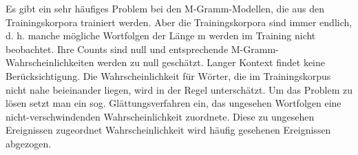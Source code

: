 Es gibt ein sehr h\"aufiges Problem bei den M-Gramm-Modellen, die aus den Trainingskorpora trainiert werden. Aber die Trainingskorpora sind immer endlich, d. h.  manche m\"ogliche Wortfolgen der L\"ange m werden im Training nicht beobachtet. Ihre Counts sind null und entsprechende M-Gramm-Wahrscheinlichkeiten werden zu null gesch\"atzt. Langer Kontext findet keine Ber\"ucksichtigung. Die Wahrscheinlichkeit f\"ur W\"orter, die im Trainingskorpus nicht nahe beieinander liegen, wird in der Regel untersch\"atzt.
Um das Problem zu l\"osen setzt man ein sog. Gl\"attungsverfahren ein, das ungesehen Wortfolgen eine nicht-verschwindenden Wahrscheinlichkeit zuordnete. Diese zu ungesehen Ereignissen zugeordnet Wahrscheinlichkeit wird h\"aufig gesehenen Ereignissen abgezogen.
